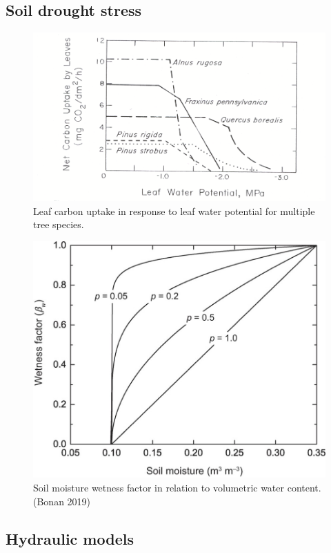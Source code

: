 \documentclass[12pt,oneside]{book}
\begin{document}
\subsection{Soil drought stress}\label{soil-drought-stress}

\begin{figure}

{\centering \includegraphics[width=0.8\linewidth]{figures/chap2/leafWP} 

}

\caption{Leaf carbon uptake in response to leaf water potential for multiple tree species.}\label{fig:f216}
\end{figure}

\begin{figure}

{\centering \includegraphics[width=0.8\linewidth]{figures/chap2/SWfactor} 

}

\caption{Soil moisture wetness factor in relation to volumetric water content. (Bonan 2019)}\label{fig:f217}
\end{figure}

\subsection{Hydraulic models}\label{hydraulic-models}
\end{document}
